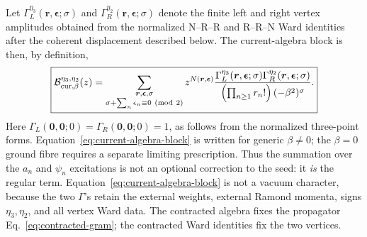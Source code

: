 \documentclass[11pt]{article}
\newcommand{\B}{\mathcal B}
\begin{document}
Let
\(\Gamma_L^{\eta_3}(\bm r,\bm\epsilon;\sigma)\) and
\(\Gamma_R^{\eta_2}(\bm r,\bm\epsilon;\sigma)\) denote the finite
left and right vertex amplitudes obtained from the normalized
N--R--R and R--R--N Ward identities after the coherent displacement
described below.  The current-algebra block is then, by definition,
\begin{equation}
 \boxed{
 \B_{{\rm cur},\beta}^{\eta_3,\eta_2}(z)
 =
 \sum_{\substack{\bm r,\bm\epsilon,\sigma\\
                  \sigma+\sum_n\epsilon_n\equiv0\ ({\rm mod}\ 2)}}
 z^{N(\bm r,\bm\epsilon)}
 \frac{
  \Gamma_L^{\eta_3}(\bm r,\bm\epsilon;\sigma)
  \Gamma_R^{\eta_2}(\bm r,\bm\epsilon;\sigma)}
 {\left(\prod_{n\geq1}r_n!\right)(-\beta^2)^\sigma}.}
 \label{eq:current-algebra-block}
\end{equation}
Here \(\Gamma_L(\bm0,\bm0;0)=\Gamma_R(\bm0,\bm0;0)=1\), as follows
from the normalized three-point forms.  Equation~\eqref{eq:current-algebra-block}
is written for generic \(\beta\neq0\); the \(\beta=0\) ground fibre
requires a separate limiting prescription.
Thus the summation over the \(a_n\) and \(\psi_n\) excitations is not
an optional correction to the seed: it \emph{is} the regular term.
Equation~\eqref{eq:current-algebra-block} is not a vacuum character,
because the two \(\Gamma\)'s retain the external weights, external
Ramond momenta, signs \(\eta_3,\eta_2\), and all vertex Ward data.
The contracted algebra fixes the propagator
Eq.~\eqref{eq:contracted-gram}; the contracted Ward identities fix the
two vertices.
\end{document}
